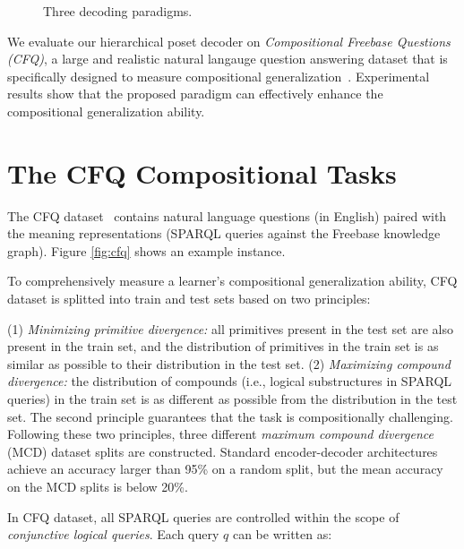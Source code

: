 \documentclass{article}
\begin{document}
\begin{figure}
\centering
\small
{}
\caption{Three decoding paradigms. }
\label{fig:paradigms}
\end{figure}

We evaluate our hierarchical poset decoder on \emph{Compositional Freebase Questions (CFQ)}, a large and realistic natural langauge question answering dataset that is specifically designed to measure compositional generalization~\citep{keysers2020measuring}.
Experimental results show that the proposed paradigm can effectively enhance the compositional generalization ability.


\section{The CFQ Compositional Tasks}
\label{sec:cfq}

The CFQ dataset~\citep{keysers2020measuring} contains natural language questions (in English) paired with the meaning representations (SPARQL queries against the Freebase knowledge graph).
Figure \ref{fig:cfq} shows an example instance.

To comprehensively measure a learner's compositional generalization ability, CFQ dataset is splitted into train and test sets based on two principles:

(1) \emph{Minimizing primitive divergence:}
all primitives present in the test set are also present in the train set, and the distribution of primitives in the train set is as similar as possible to their distribution in the test set.
(2) \emph{Maximizing compound divergence:}
the distribution of compounds (i.e., logical substructures in SPARQL queries) in the train set is as different as possible from the distribution in the test set.
The second principle guarantees that the task is compositionally challenging.
Following these two principles, three different \emph{maximum compound divergence} (MCD) dataset splits are constructed.
Standard encoder-decoder architectures achieve an accuracy larger than 95\% on a random split, but the mean accuracy on the MCD splits is below 20\%.

In CFQ dataset, all SPARQL queries are controlled within the scope of \emph{conjunctive logical queries}.
Each query $q$ can be written as:
\end{document}
